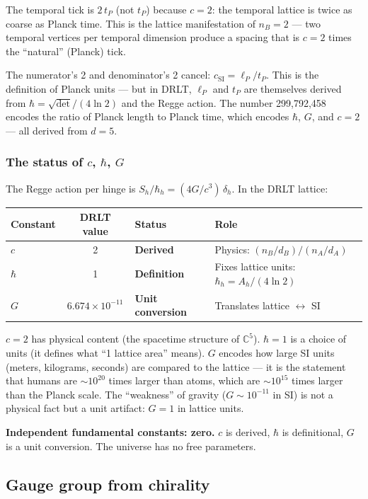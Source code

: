 \documentclass[12pt]{article}
\theoremstyle{remark}
\theoremstyle{definition}
\newcommand{\CC}{\mathbb{C}}
\begin{document}
The temporal tick is $2\,t_P$ (not $t_P$) because $c = 2$: the temporal lattice is twice as coarse as Planck time. This is the lattice manifestation of $n_B = 2$ --- two temporal vertices per temporal dimension produce a spacing that is $c = 2$ times the ``natural'' (Planck) tick.

The numerator's 2 and denominator's 2 cancel: $c_\text{SI} = \ell_P/t_P$. This is the definition of Planck units --- but in DRLT, $\ell_P$ and $t_P$ are themselves derived from $\hbar = \sqrt{\det}/(4\ln 2)$ and the Regge action. The number 299{,}792{,}458 encodes the ratio of Planck length to Planck time, which encodes $\hbar$, $G$, and $c = 2$ --- all derived from $d = 5$.

\subsubsection{The status of $c$, $\hbar$, $G$}

The Regge action per hinge is $S_h/\hbar_h = (4G/c^3)\,\delta_h$. In the DRLT lattice:

\begin{center}
\begin{tabular}{lcll}
\hline
Constant & DRLT value & Status & Role \\
\hline
$c$ & 2 & \textbf{Derived} & Physics: $(n_B/d_B)/(n_A/d_A)$ \\
$\hbar$ & 1 & \textbf{Definition} & Fixes lattice units: $\hbar_h = A_h/(4\ln 2)$ \\
$G$ & $6.674 \times 10^{-11}$ & \textbf{Unit conversion} & Translates lattice $\leftrightarrow$ SI \\
\hline
\end{tabular}
\end{center}

$c = 2$ has physical content (the spacetime structure of $\CC^5$). $\hbar = 1$ is a choice of units (it defines what ``1 lattice area'' means). $G$ encodes how large SI units (meters, kilograms, seconds) are compared to the lattice --- it is the statement that humans are $\sim\!10^{20}$ times larger than atoms, which are $\sim\!10^{15}$ times larger than the Planck scale. The ``weakness'' of gravity ($G \sim 10^{-11}$ in SI) is not a physical fact but a unit artifact: $G = 1$ in lattice units.

\textbf{Independent fundamental constants: zero.} $c$ is derived, $\hbar$ is definitional, $G$ is a unit conversion. The universe has no free parameters.

\subsection{Gauge group from chirality}
\end{document}
